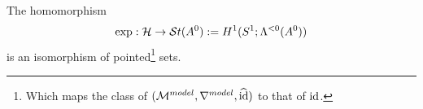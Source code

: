 \begin{tthm} \label{thm:mainThm1}
  The homomorphism
  \[
    \exp:\mathcal{H}\to\mathcal{S}{}t(A^0):=H^1(S^1;\Lambda^{<0}(A^0))
  \]
  is an isomorphism of pointed\footnote{Which maps the class of
    $(\mathcal{M}^{model},\nabla^{model},\widehat{\operatorname{id}})$ to that of $\operatorname{id}$.} sets.
\end{tthm}
\begin{comment}
  \begin{rem}
    \marginnote{\cite{Loday1994} Remark I.2.2}
    To another normal form $A^1={}^\Phi\!A^0$ there correspond cochains which
    are conjugated via $\Phi$.
    We get the following commutative diagram:
    \[ \begin{tikzcd}
        G\backslash\hat G(A^1) \rar{\cdot\Phi}\dar{\exp}
        & G\backslash\hat G(A^0) \dar{\exp}
        & \hat F \arrow[|->]{r}\arrow[|->]{d}
        & \hat F\Phi \arrow[|->]{d}
      \\ H^1(S^1;\lambda(A^1)) \rar
        & H^1(S^1;\lambda(A^0))
        & \exp_{\mu_1}(\hat F) \arrow[|->]{r}
        & \exp_{\mu_0}(\hat F\Phi)
    \end{tikzcd} \]
    where $\exp_{\mu_0}(\hat F\Phi)=\Phi^{-1}\exp_{\mu_0}(\hat F)\Phi$.
  \end{rem}
\end{comment}

